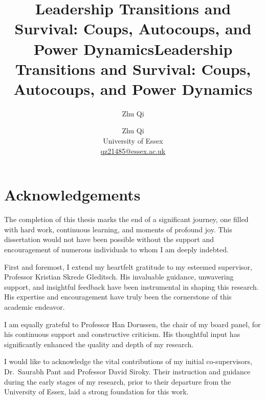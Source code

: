 \documentclass[
  12pt,
]{report}
\title{Leadership Transitions and Survival: Coups, Autocoups, and Power
Dynamics}
\author{Zhu Qi}
\date{}
\renewcommand*\contentsname{Table of contents}
\newcommand\contentsname{Table of contents}
\begin{document}
\def\spacingset#1{\renewcommand{\baselinestretch}%
{#1}\small\normalsize} \spacingset{1}



\title{\bf Leadership Transitions and Survival: Coups, Autocoups, and
Power Dynamics}
\author{
Zhu Qi\\University of
Essex\\\href{mailto:qz21485@essex.ac.uk}{qz21485@essex.ac.uk}
}

\maketitle

\bigskip
\bigskip
\begin{abstract}

\end{abstract}


\newpage
\spacingset{1.9} %
\renewcommand*\contentsname{Contents}
{
\hypersetup{linkcolor=}
\setcounter{tocdepth}{2}
\tableofcontents
}
\listoffigures
\listoftables

\chapter*{Acknowledgements}\label{acknowledgements}

The completion of this thesis marks the end of a significant journey,
one filled with hard work, continuous learning, and moments of profound
joy. This dissertation would not have been possible without the support
and encouragement of numerous individuals to whom I am deeply indebted.

First and foremost, I extend my heartfelt gratitude to my esteemed
supervisor, Professor Kristian Skrede Gleditsch. His invaluable
guidance, unwavering support, and insightful feedback have been
instrumental in shaping this research. His expertise and encouragement
have truly been the cornerstone of this academic endeavor.

I am equally grateful to Professor Han Dorussen, the chair of my board
panel, for his continuous support and constructive criticism. His
thoughtful input has significantly enhanced the quality and depth of my
research.

I would like to acknowledge the vital contributions of my initial
co-supervisors, Dr.~Saurabh Pant and Professor David Siroky. Their
instruction and guidance during the early stages of my research, prior
to their departure from the University of Essex, laid a strong
foundation for this work.
\end{document}
